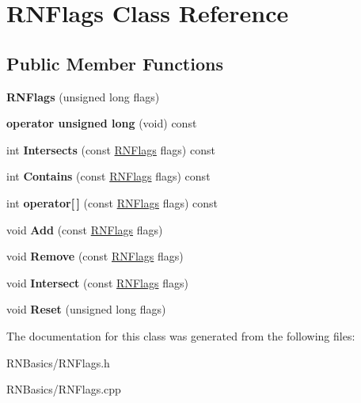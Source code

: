 \hypertarget{class_r_n_flags}{}\section{R\+N\+Flags Class Reference}
\label{class_r_n_flags}
\subsection*{Public Member Functions}
\begin{DoxyCompactItemize}
\item 
{\bfseries R\+N\+Flags} (unsigned long flags)\hypertarget{class_r_n_flags_aa56719d3709b421a024a3e6b6566674b}{}\label{class_r_n_flags_aa56719d3709b421a024a3e6b6566674b}

\item 
{\bfseries operator unsigned long} (void) const \hypertarget{class_r_n_flags_a655274322f3db2daa5d3e2b563df0065}{}\label{class_r_n_flags_a655274322f3db2daa5d3e2b563df0065}

\item 
int {\bfseries Intersects} (const \hyperlink{class_r_n_flags}{R\+N\+Flags} flags) const \hypertarget{class_r_n_flags_a3f543e5c7804dd261b1574e0f0fa1945}{}\label{class_r_n_flags_a3f543e5c7804dd261b1574e0f0fa1945}

\item 
int {\bfseries Contains} (const \hyperlink{class_r_n_flags}{R\+N\+Flags} flags) const \hypertarget{class_r_n_flags_a2ccb1f565cd27110f8684155dba1186b}{}\label{class_r_n_flags_a2ccb1f565cd27110f8684155dba1186b}

\item 
int {\bfseries operator\mbox{[}$\,$\mbox{]}} (const \hyperlink{class_r_n_flags}{R\+N\+Flags} flags) const \hypertarget{class_r_n_flags_ad0d015b219e00abea186404c63d28cf4}{}\label{class_r_n_flags_ad0d015b219e00abea186404c63d28cf4}

\item 
void {\bfseries Add} (const \hyperlink{class_r_n_flags}{R\+N\+Flags} flags)\hypertarget{class_r_n_flags_ab45bb4fe40ed82ac2b2c4dc6b2faef83}{}\label{class_r_n_flags_ab45bb4fe40ed82ac2b2c4dc6b2faef83}

\item 
void {\bfseries Remove} (const \hyperlink{class_r_n_flags}{R\+N\+Flags} flags)\hypertarget{class_r_n_flags_aba8e5b000ef9f882047578dbf85e373c}{}\label{class_r_n_flags_aba8e5b000ef9f882047578dbf85e373c}

\item 
void {\bfseries Intersect} (const \hyperlink{class_r_n_flags}{R\+N\+Flags} flags)\hypertarget{class_r_n_flags_add705c6ede94a84bebf4f9ec970bb2fa}{}\label{class_r_n_flags_add705c6ede94a84bebf4f9ec970bb2fa}

\item 
void {\bfseries Reset} (unsigned long flags)\hypertarget{class_r_n_flags_a995c2f033403cd22d5491c81bc4b4b21}{}\label{class_r_n_flags_a995c2f033403cd22d5491c81bc4b4b21}

\end{DoxyCompactItemize}


The documentation for this class was generated from the following files\+:\begin{DoxyCompactItemize}
\item 
R\+N\+Basics/R\+N\+Flags.\+h\item 
R\+N\+Basics/R\+N\+Flags.\+cpp\end{DoxyCompactItemize}
